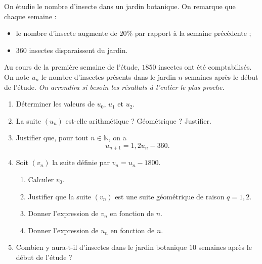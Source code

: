 \documentclass[11pt]{article}
\begin{document}
On étudie le nombre d'insecte dans un jardin botanique. On remarque que chaque
semaine :
\begin{itemize}
  \item le nombre d'insecte augmente de $20$\% par rapport à la semaine
    précédente ;
  \item $360$ insectes disparaissent du jardin.
\end{itemize}
Au cours de la première semaine de l'étude, $1850$ insectes ont été
comptabilisés. On note $u_n$ le nombre d'insectes présents dans le jardin $n$
semaines après le début de l'étude. \emph{On arrondira si besoin les résultats à
l'entier le plus proche.}
\begin{enumerate}
  \item Déterminer les valeurs de $u_0$, $u_1$ et $u_2$.
  \item La suite $\left( u_n \right)$ est-elle arithmétique ? Géométrique ? Justifier.
  \item Justifier que, pour tout $n\in\mathbb{N}$, on a 
    \[
      u_{n+1} = 1,2u_n-360.
    \]
  \item Soit $\left( v_n \right)$ la suite définie par $v_n = u_n - 1800$.
    \begin{enumerate}
      \item Calculer $v_0$.
      \item Justifier que la suite $\left( v_n \right)$ est une suite
        géométrique de raison $q=1,2$.
      \item Donner l'expression de $v_n$ en fonction de $n$.
      \item Donner l'expression de $u_n$ en fonction de $n$.
    \end{enumerate}
  \item Combien y aura-t-il d'insectes dans le jardin botanique $10$ semaines
    après le début de l'étude ?
\end{enumerate}
\end{document}
